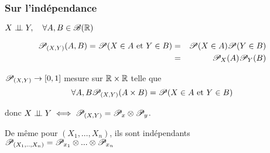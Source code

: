 \subsubsection{Sur l'indépendance}

$X \perp\!\!\! \perp Y, \quad \forall A,B \in \mathscr{B} (\mathbb{R})$

\begin{eqnarray*}
	\mathscr{P}_{(X,Y)}(A,B)= \mathscr{P} (X \in A \text{ et } Y \in B)
	&=& \mathscr{P}(X\in A) \mathscr{P}(Y\in B)\\
	&=& \mathscr{P}_X(A) \mathscr{P}_Y( B)
\end{eqnarray*}


$\mathscr{P}_{(X,Y)} \to [0,1]$ mesure sur $\mathbb{R} \times \mathbb{R}$ telle que
$$\forall A,B\mathscr{P}_{(X,Y)}(A\times B) = \mathscr{P} (X\in A \text{ et } Y \in B)$$

donc $X \perp\!\!\! \perp Y\iff \mathscr{P}_{(X,Y)} = \mathscr{P}_x \otimes \mathscr{P}_y$.

De même pour $(X_1, \dots, X_n)$, ils sont indépendants \ssi $\mathscr{P}_{(X_1,.., X_n)} =\mathscr{P}_{x_1} \otimes ... \otimes  \mathscr{P}_{x_n} $

